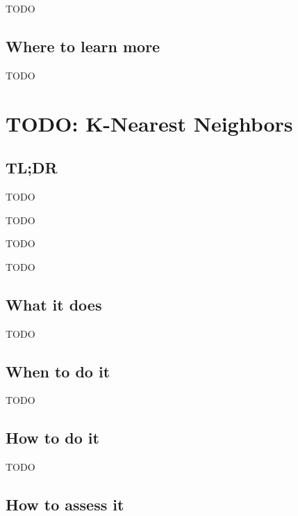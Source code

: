 \documentclass[
]{book}
\providecommand{\tightlist}{%
  \setlength{\itemsep}{0pt}\setlength{\parskip}{0pt}}
\begin{document}
TODO

\hypertarget{where-to-learn-more-5}{%
\section{Where to learn more}\label{where-to-learn-more-5}}

TODO

\hypertarget{k-nearest-neighbors}{%
\chapter{TODO: K-Nearest Neighbors}\label{k-nearest-neighbors}}

\hypertarget{tldr-6}{%
\section{TL;DR}\label{tldr-6}}

\begin{description}
\tightlist
\item[What it does]
TODO
\item[When to do it]
TODO
\item[How to do it]
TODO
\item[How to assess it]
TODO
\end{description}

\hypertarget{what-it-does-6}{%
\section{What it does}\label{what-it-does-6}}

TODO

\hypertarget{when-to-do-it-6}{%
\section{When to do it}\label{when-to-do-it-6}}

TODO

\hypertarget{how-to-do-it-6}{%
\section{How to do it}\label{how-to-do-it-6}}

TODO

\hypertarget{how-to-assess-it-6}{%
\section{How to assess it}\label{how-to-assess-it-6}}
\end{document}
